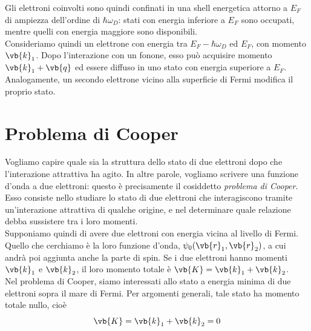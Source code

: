 \hspace{-0.6cm}Gli elettroni coinvolti sono quindi confinati in una shell energetica attorno a $E_F$ di ampiezza dell'ordine di $\hbar \omega_D$: stati con energia inferiore a $E_F$ sono occupati, mentre quelli con energia maggiore sono disponibili.\\
Consideriamo quindi un elettrone con energia tra $E_F - \hbar \omega_D$ ed $E_F$, con momento $\vb{k}_1$. Dopo l'interazione con un fonone, esso può acquisire momento $\vb{k}_1 + \vb{q}$ ed essere diffuso in uno stato con energia superiore a $E_F$. Analogamente, un secondo elettrone vicino alla superficie di Fermi modifica il proprio stato.
\section{Problema di Cooper}
Vogliamo capire quale sia la struttura dello stato di due elettroni dopo che l'interazione attrattiva ha agito. In altre parole, vogliamo scrivere una funzione d'onda a due elettroni: questo è precisamente il cosiddetto \emph{problema di Cooper}. Esso consiste nello studiare lo stato di due elettroni che interagiscono tramite un'interazione attrattiva di qualche origine, e nel determinare quale relazione debba sussistere tra i loro momenti.\\
Supponiamo quindi di avere due elettroni con energia vicina al livello di Fermi. Quello che cerchiamo è la loro funzione d'onda, $\psi_0(\vb{r}_1,\vb{r}_2)$, a cui andrà poi aggiunta anche la parte di spin. Se i due elettroni hanno momenti $\vb{k}_1$ e $\vb{k}_2$, il loro momento totale è $\vb{K}=\vb{k}_1 + \vb{k}_2$.\\
Nel problema di Cooper, siamo interessati allo stato a energia minima di due elettroni sopra il mare di Fermi. Per argomenti generali, tale stato ha momento totale nullo, cioè
\begin{equation*}
   \vb{K}=\vb{k}_1 + \vb{k}_2=0
\end{equation*}
